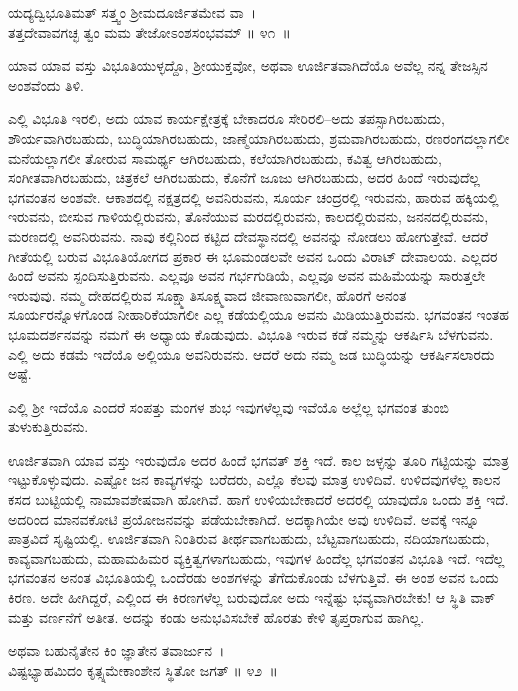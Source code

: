 \begin{shloka}
ಯದ್ಯದ್ವಿಭೂತಿಮತ್ ಸತ್ತ್ವಂ ಶ‍್ರೀಮದೂರ್ಜಿತಮೇವ ವಾ~।\\ತತ್ತದೇವಾವಗಚ್ಛ ತ್ವಂ ಮಮ ತೇಜೋಽಂಶಸಂಭವಮ್ \hfill॥ ೪೧~॥
\end{shloka}

\begin{artha}
ಯಾವ ಯಾವ ವಸ್ತು ವಿಭೂತಿಯುಳ್ಳದ್ದೊ, ಶ‍್ರೀಯುಕ್ತವೋ, ಅಥವಾ ಊರ್ಜಿತವಾಗಿದೆಯೊ ಅವೆಲ್ಲ ನನ್ನ ತೇಜಸ್ಸಿನ ಅಂಶವೆಂದು ತಿಳಿ.
\end{artha}

ಎಲ್ಲಿ ವಿಭೂತಿ ಇರಲಿ, ಅದು ಯಾವ ಕಾರ್ಯಕ್ಷೇತ್ರಕ್ಕೆ ಬೇಕಾದರೂ ಸೇರಿರಲಿ–\-ಅದು ತಪಸ್ಸಾಗಿರಬಹುದು, ಶೌರ್ಯವಾಗಿರಬಹುದು, ಬುದ್ಧಿಯಾಗಿರಬಹುದು, ಜಾಣ್ಮೆಯಾಗಿರ\break ಬಹುದು, ಶ್ರಮವಾಗಿರಬಹುದು, ರಣರಂಗದಲ್ಲಾಗಲೀ ಮನೆಯಲ್ಲಾಗಲೀ ತೋರುವ ಸಾಮರ್ಥ್ಯ ಆಗಿರಬಹುದು, ಕಲೆಯಾಗಿರಬಹುದು, ಕವಿತ್ವ ಆಗಿರಬಹುದು, ಸಂಗೀತವಾಗಿರಬಹುದು, ಚಿತ್ರ\-ಕಲೆ ಆಗಿರಬಹುದು, ಕೊನೆಗೆ ಜೂಜು ಆಗಿರಬಹುದು, ಅದರ ಹಿಂದೆ ಇರುವುದೆಲ್ಲ ಭಗವಂತನ ಅಂಶವೇ. ಆಕಾಶದಲ್ಲಿ ನಕ್ಷತ್ರದಲ್ಲಿ ಅವನಿರುವನು, ಸೂರ್ಯ ಚಂದ್ರರಲ್ಲಿ ಇರುವನು, ಹಾರುವ ಹಕ್ಕಿಯಲ್ಲಿ ಇರುವನು, ಬೀಸುವ ಗಾಳಿಯಲ್ಲಿರುವನು, ತೊನೆಯುವ ಮರದಲ್ಲಿರುವನು, ಕಾಲ\-ದಲ್ಲಿರುವನು, ಜನನದಲ್ಲಿರುವನು, ಮರಣದಲ್ಲಿ ಅವನಿರುವನು. ನಾವು ಕಲ್ಲಿನಿಂದ ಕಟ್ಟಿದ ದೇವಸ್ಥಾನದಲ್ಲಿ ಅವನನ್ನು ನೋಡಲು ಹೋಗುತ್ತೇವೆ. ಆದರೆ ಗೀತೆಯಲ್ಲಿ ಬರುವ ವಿಭೂತಿ\-ಯೋಗದ ಪ್ರಕಾರ ಈ ಭೂಮಂಡಲವೇ ಅವನ ಒಂದು ವಿರಾಟ್ ದೇವಾಲಯ. ಎಲ್ಲದರ ಹಿಂದೆ ಅವನು ಸ್ಪಂದಿಸುತ್ತಿರುವನು. ಎಲ್ಲವೂ ಅವನ ಗರ್ಭಗುಡಿಯೆ, ಎಲ್ಲವೂ ಅವನ ಮಹಿಮೆಯನ್ನು ಸಾರುತ್ತಲೇ ಇರುವುವು. ನಮ್ಮ ದೇಹದಲ್ಲಿರುವ ಸೂಕ್ಷ್ಮಾತಿಸೂಕ್ಷ್ಮವಾದ ಜೀವಾಣುವಾಗಲೀ, ಹೊರಗೆ ಅನಂತ ಸೂರ್ಯರನ್ನೊಳಗೊಂಡ ನೀಹಾರಿಕೆಯಾಗಲೀ ಎಲ್ಲ ಕಡೆಯಲ್ಲಿಯೂ ಅವನು ಮಿಡಿಯುತ್ತಿರುವನು. ಭಗವಂತನ ಇಂತಹ ಭೂಮದರ್ಶನವನ್ನು ನಮಗೆ ಈ ಅಧ್ಯಾಯ ಕೊಡುವುದು. ವಿಭೂತಿ ಇರುವ ಕಡೆ ನಮ್ಮನ್ನು ಆಕರ್ಷಿಸಿ ಬೆಳಗುವನು. ಎಲ್ಲಿ ಅದು ಕಡಮೆ ಇದೆಯೊ ಅಲ್ಲಿಯೂ ಅವನಿರುವನು. ಆದರೆ ಅದು ನಮ್ಮ ಜಡ ಬುದ್ಧಿಯನ್ನು ಆಕರ್ಷಿಸಲಾರದು ಅಷ್ಟೆ.

ಎಲ್ಲಿ ಶ‍್ರೀ ಇದೆಯೊ ಎಂದರೆ ಸಂಪತ್ತು ಮಂಗಳ ಶುಭ ಇವುಗಳೆಲ್ಲವು ಇವೆಯೊ ಅಲ್ಲೆಲ್ಲ ಭಗವಂತ ತುಂಬಿ ತುಳುಕುತ್ತಿರುವನು.

ಊರ್ಜಿತವಾಗಿ ಯಾವ ವಸ್ತು ಇರುವುದೊ ಅದರ ಹಿಂದೆ ಭಗವತ್ ಶಕ್ತಿ ಇದೆ. ಕಾಲ ಜಳ್ಳನ್ನು ತೂರಿ ಗಟ್ಟಿಯನ್ನು ಮಾತ್ರ ಇಟ್ಟುಕೊಳ್ಳುವುದು. ಎಷ್ಟೋ ಜನ ಕಾವ್ಯಗಳನ್ನು ಬರೆದರು, ಎಲ್ಲೊ ಕೆಲವು ಮಾತ್ರ ಉಳಿದಿವೆ. ಉಳಿದವುಗಳೆಲ್ಲ ಕಾಲನ ಕಸದ ಬುಟ್ಟಿಯಲ್ಲಿ ನಾಮಾವಶೇಷವಾಗಿ ಹೋಗಿವೆ. ಹಾಗೆ ಉಳಿಯಬೇಕಾದರೆ ಅದರಲ್ಲಿ ಯಾವುದೊ ಒಂದು ಶಕ್ತಿ ಇದೆ. ಅದರಿಂದ ಮಾನವಕೋಟಿ ಪ್ರಯೋಜನವನ್ನು ಪಡೆಯಬೇಕಾಗಿದೆ. ಅದಕ್ಕಾಗಿಯೇ ಅವು ಉಳಿದಿವೆ. ಅವಕ್ಕೆ ಇನ್ನೂ ಪಾತ್ರವಿದೆ ಸೃಷ್ಟಿಯಲ್ಲಿ. ಊರ್ಜಿತವಾಗಿ ನಿಂತಿರುವ ತೀರ್ಥವಾಗಬಹುದು, ಬೆಟ್ಟವಾಗಬಹುದು, ನದಿಯಾಗಬಹುದು, ಕಾವ್ಯವಾಗಬಹುದು, ಮಹಾಮಹಿಮರ ವ್ಯಕ್ತಿತ್ವಗಳಾಗಬಹುದು, ಇವುಗಳ ಹಿಂದೆಲ್ಲ ಭಗವಂತನ ವಿಭೂತಿ ಇದೆ. ಇದೆಲ್ಲ ಭಗವಂತನ ಅನಂತ ವಿಭೂತಿಯಲ್ಲಿ ಒಂದೆರಡು ಅಂಶಗಳನ್ನು ತೆಗೆದುಕೊಂಡು ಬೆಳಗುತ್ತಿವೆ. ಈ ಅಂಶ ಅವನ ಒಂದು ಕಿರಣ. ಅದೇ ಹೀಗಿದ್ದರೆ, ಎಲ್ಲಿಂದ ಈ ಕಿರಣಗಳೆಲ್ಲ ಬರುವುದೋ ಅದು ಇನ್ನೆಷ್ಟು ಭವ್ಯವಾಗಿರಬೇಕು! ಆ ಸ್ಥಿತಿ ವಾಕ್ ಮತ್ತು ವರ್ಣನೆಗೆ ಅತೀತ. ಅದನ್ನು ಕಂಡು ಅನುಭವಿಸಬೇಕೆ ಹೊರತು ಕೇಳಿ ತೃಪ್ತರಾಗುವ ಹಾಗಿಲ್ಲ.

\begin{shloka}
ಅಥವಾ ಬಹುನೈತೇನ ಕಿಂ ಜ್ಞಾತೇನ ತವಾರ್ಜುನ~।\\ವಿಷ್ಟಭ್ಯಾಹಮಿದಂ ಕೃತ್ಸ್ನಮೇಕಾಂಶೇನ ಸ್ಥಿತೋ ಜಗತ್ \hfill॥ ೪೨~॥
\end{shloka}

